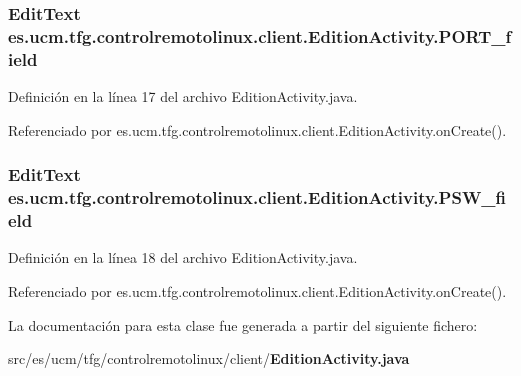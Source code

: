 \subsubsection[{P\-O\-R\-T\-\_\-field}]{\setlength{\rightskip}{0pt plus 5cm}Edit\-Text es.\-ucm.\-tfg.\-controlremotolinux.\-client.\-Edition\-Activity.\-P\-O\-R\-T\-\_\-field\hspace{0.3cm}{\ttfamily [private]}}\label{classes_1_1ucm_1_1tfg_1_1controlremotolinux_1_1client_1_1EditionActivity_a72943766fb49a247c1f142ad56943503}


Definición en la línea 17 del archivo Edition\-Activity.\-java.



Referenciado por es.\-ucm.\-tfg.\-controlremotolinux.\-client.\-Edition\-Activity.\-on\-Create().

\subsubsection[{P\-S\-W\-\_\-field}]{\setlength{\rightskip}{0pt plus 5cm}Edit\-Text es.\-ucm.\-tfg.\-controlremotolinux.\-client.\-Edition\-Activity.\-P\-S\-W\-\_\-field\hspace{0.3cm}{\ttfamily [private]}}\label{classes_1_1ucm_1_1tfg_1_1controlremotolinux_1_1client_1_1EditionActivity_a210fc8d3ea5b5e07f0f7339a45c2ef37}


Definición en la línea 18 del archivo Edition\-Activity.\-java.



Referenciado por es.\-ucm.\-tfg.\-controlremotolinux.\-client.\-Edition\-Activity.\-on\-Create().



La documentación para esta clase fue generada a partir del siguiente fichero\-:\begin{DoxyCompactItemize}
\item 
src/es/ucm/tfg/controlremotolinux/client/{\bf Edition\-Activity.\-java}\end{DoxyCompactItemize}
